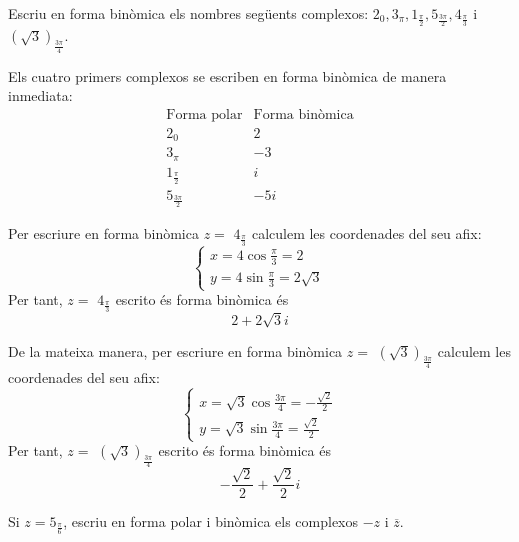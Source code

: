 \begin{exemple}
Escriu en forma binòmica els nombres següents complexos: $
2_{0},3_{\pi },1_{\frac{\pi }{2}},5_{\frac{3\pi }{2}},4_{\frac{\pi }{3}}$ i $
\left( \sqrt{3}\right) _{\frac{3\pi }{4}}$.
\end{exemple}

\begin{solucio}
Els cuatro primers complexos se escriben en forma binòmica de manera
inmediata:
\begin{equation*}
\begin{array}{cc}
\text{Forma polar} & \text{Forma binòmica} \\
2_{0} & 2 \\
3_{\pi } & -3 \\
1_{\frac{\pi }{2}} & i \\
5_{\frac{3\pi }{2}} & -5i
\end{array}
\end{equation*}

Per escriure en forma binòmica $z=$ $4_{\frac{\pi }{3}}$ calculem les
coordenades del seu afix:
\begin{equation*}
\left\{
\begin{array}{l}
x=4\cos \frac{\pi }{3}=2 \\
y=4\sin \frac{\pi }{3}=2\sqrt{3}
\end{array}
\right.
\end{equation*}
Per tant, $z=$ $4_{\frac{\pi }{3}}$ escrito és forma binòmica és
\begin{equation*}
2+2\sqrt{3}i
\end{equation*}

De la mateixa manera, per escriure en forma binòmica $z=$ $\left( \sqrt{3}
\right) _{\frac{3\pi }{4}}$ calculem les coordenades del seu afix:
\begin{equation*}
\left\{
\begin{array}{l}
x=\sqrt{3}\cos \frac{3\pi }{4}=-\frac{\sqrt{2}}{2} \\
y=\sqrt{3}\sin \frac{3\pi }{4}=\frac{\sqrt{2}}{2}
\end{array}
\right.
\end{equation*}
Per tant, $z=$ $\left( \sqrt{3}\right) _{\frac{3\pi }{4}}$ escrito és forma
binòmica és
\begin{equation*}
-\frac{\sqrt{2}}{2}+\frac{\sqrt{2}}{2}i
\end{equation*}
\end{solucio}

\begin{exemple}
Si $z=5_{\frac{\pi }{6}}$, escriu en forma polar i binòmica els
complexos $-z$ i $\overline{z}$.
\end{exemple}

